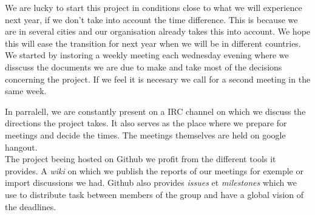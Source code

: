 We are lucky to start this project in conditions close to what we will experience next year, if we don't take into account the time difference. This is because we are in several cities and our organisation already takes this into account. We hope this will ease the transition for next year when we will be in different countries.\\

We started by instoring a weekly meeting each wednesday evening where we disscuss the documents we are due to make and take most of the decisions concerning the project. If we feel it is necesary we call for a second meeting in the same week.

In parralell, we are constantly present on a IRC channel on which we discuss the directions the project takes. It also serves as the place where we prepare for meetings and decide the times. The meetings themselves are held on google hangout.\\

The project beeing hosted on Github we profit from the different tools it provides. A \textit{wiki} on which we publish the reports of our meetings for exemple or import discussions we had. Github also provides \textit{issues} et \textit{milestones} which we use to distribute task between members of the group and have a global vision of the deadlines.
